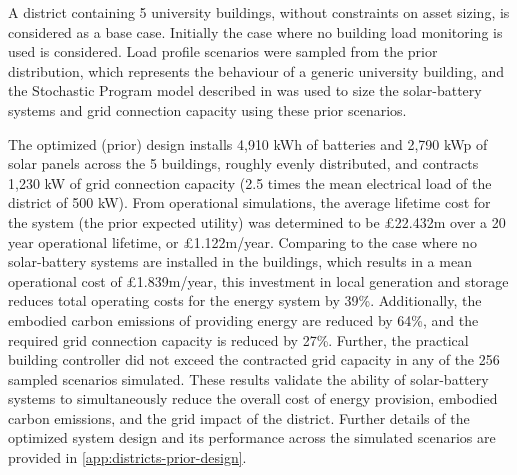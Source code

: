 
A district containing 5 university buildings, without constraints on asset sizing, is considered as a base case. Initially the case where no building load monitoring is used is considered. Load profile scenarios were sampled from the prior distribution, which represents the behaviour of a generic university building, and the Stochastic Program model described in  was used to size the solar-battery systems and grid connection capacity using these prior scenarios.

The optimized (prior) design installs 4,910 kWh of batteries and 2,790 kWp of solar panels across the 5 buildings, roughly evenly distributed, and contracts 1,230 kW of grid connection capacity (2.5 times the mean electrical load of the district of 500 kW). From operational simulations, the average lifetime cost for the system (the prior expected utility) was determined to be £22.432m over a 20 year operational lifetime, or £1.122m/year. Comparing to the case where no solar-battery systems are installed in the buildings, which results in a mean operational cost of £1.839m/year, this investment in local generation and storage reduces total operating costs for the energy system by 39\%. Additionally, the embodied carbon emissions of providing energy are reduced by 64\%, and the required grid connection capacity is reduced by 27\%. Further, the practical building controller did not exceed the contracted grid capacity in any of the 256 sampled scenarios simulated. These results validate the ability of solar-battery systems to simultaneously reduce the overall cost of energy provision, embodied carbon emissions, and the grid impact of the district. Further details of the optimized system design and its performance across the simulated scenarios are provided in \ref{app:districts-prior-design}.

